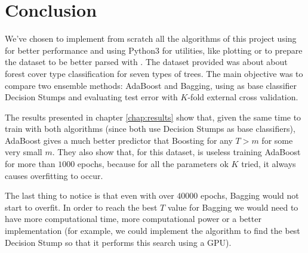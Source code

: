 \chapter{Conclusion}
We've chosen to implement from scratch all the algorithms of this project using  for better performance and using Python3 for utilities, like plotting or to prepare the dataset to be better parsed with \CC. The dataset provided was about about forest cover type classification for seven types of trees. The main objective was to compare two ensemble methods: AdaBoost and Bagging, using as base classifier Decision Stumps and evaluating test error with $K$-fold external cross validation.

The results presented in chapter \ref{chap:results} show that, given the same time to train with both algorithms (since both use Decision Stumps as base classifiers), AdaBoost gives a much better predictor that Boosting for any $T > m$ for some very small $m$. They also show that, for this dataset, is useless training AdaBoost for more than $1000$ epochs, because for all the parameters ok $K$ tried, it always causes overfitting to occur.

The last thing to notice is that even with over $40000$ epochs, Bagging would not start to overfit. In order to reach the best $T$ value for Bagging we would need to have more computational time, more computational power or a better implementation (for example, we could implement the algorithm to find the best Decision Stump so that it performs this search using a GPU).